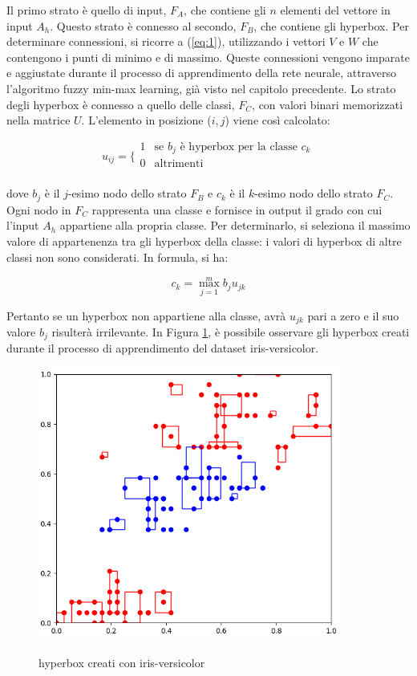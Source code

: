 \documentclass[11pt,  oneside, openany]{book}
\begin{document}
Il primo strato è quello di input, $F_A$, che contiene gli $n$ elementi del vettore in input $A_h$. Questo strato è connesso al secondo, $F_B$, che contiene gli hyperbox. Per determinare connessioni, si ricorre a (\ref{eq:1}), utilizzando i vettori $V$ e $W$ che contengono i punti di minimo e di massimo. Queste connessioni vengono imparate e aggiustate durante il processo di apprendimento della rete neurale, attraverso l'algoritmo fuzzy min-max learning, già visto nel capitolo precedente. Lo strato degli hyperbox è connesso a quello delle classi, $F_C$, con valori binari memorizzati nella matrice $U$. L'elemento in posizione ($i,j$) viene così calcolato: 

$$ u_{ij} = \bigg \{ 
\begin{array}{rl}
1 &\text{se } b_j \text{ è hyperbox per la classe } c_k \\
0 & \text{altrimenti} \\
\end{array}
$$

\noindent dove $b_j$ è il $j$-esimo nodo dello strato $ F_B$ e  $c_k$ è il $k$-esimo nodo dello strato $ F_C$. Ogni nodo in $F_C$ rappresenta una classe e fornisce in output il grado con cui l'input $A_h$ appartiene alla propria classe. Per determinarlo, si seleziona il massimo valore di appartenenza tra gli hyperbox della classe: i valori di hyperbox di altre classi non sono considerati. In formula, si ha: 

$$ c_k = \max_{j = 1}^m b_j u_{jk} $$

Pertanto se un hyperbox non appartiene alla classe, avrà $u_{jk} $ pari a zero e il suo valore $b_j$ risulterà irrilevante. 
In Figura \ref{fmm_hyperbox}, è possibile osservare gli hyperbox creati durante il processo di apprendimento del dataset iris-versicolor. 

\begin{figure}[h!]
\begin{center}
  \includegraphics[width=10cm]{Immagini/hyperbox_created_irisversicolor.png}\\
  \caption{hyperbox creati con iris-versicolor}
  \label{fmm_hyperbox}
\end{center}
\end{figure}
\end{document}
